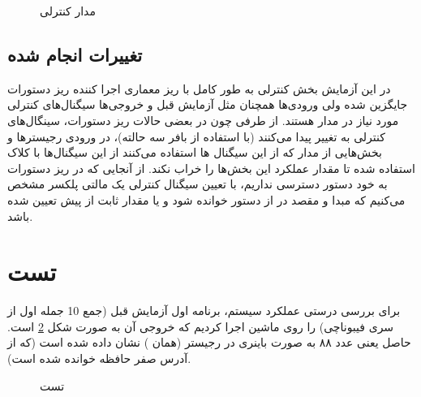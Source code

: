 \documentclass{article}
\begin{document}
\begin{figure}
	\caption{مدار کنترلی}
	\label{fig:cu}
\end{figure}

\subsection{تغییرات انجام شده}
در این آزمایش بخش کنترلی به طور کامل با ریز معماری اجرا کننده ریز دستورات جایگزین شده ولی ورودی‌ها همچنان مثل آزمایش قبل  و خروجی‌ها سیگنال‌های کنترلی مورد نیاز در مدار هستند.
از طرفی چون در بعضی حالات ریز دستورات، سینگال‌های کنترلی به  تغییر پیدا می‌کنند (با استفاده از بافر سه حالته)، در ورودی رجیسترها و بخش‌هایی از مدار که از این سیگنال ها استفاده می‌کنند از  این سیگنال‌ها با کلاک استفاده شده تا مقدار  عملکرد این بخش‌ها را خراب نکند.
از آنجایی که در ریز دستورات به خود دستور دسترسی نداریم، با تعیین سیگنال کنترلی یک مالتی پلکسر مشخص می‌کنیم که مبدا و مقصد در  از دستور خوانده شود و یا مقدار ثابت از پیش تعیین شده باشد.

\section{تست}
برای بررسی درستی عملکرد سیستم، برنامه اول آزمایش قبل (جمع 10 جمله اول از سری فیبوناچی) را روی ماشین اجرا کردیم که خروجی آن به صورت شکل \ref{fig:test} است. حاصل یعنی عدد ۸۸ به صورت باینری در رجیستر  (همان ) نشان داده شده است (که از آدرس صفر حافظه خوانده شده است).

\begin{figure}
	\caption{تست}
	\label{fig:test}
\end{figure}
\end{document}
